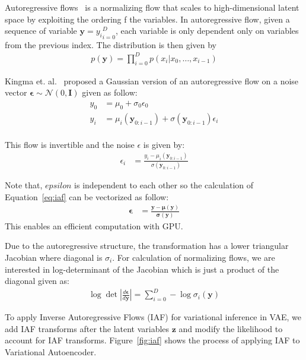\documentclass[runningheads]{llncs}
\begin{document}
Autoregressive flows~\cite{germain2015made} is a normalizing flow that scales to high-dimensional latent space by exploiting the ordering f the variables. In autoregressive flow, given a sequence of variable $\mathbf{y} = {y_i}_{i=0}^D$, each variable is only dependent only on variables from the previous index. The distribution is then given by
\begin{align}
p(\mathbf{y}) = \prod_{i=0}^{D} p(x_i | x_0,\dots,x_{i-1})
\end{align} 	 

Kingma et. al.~\cite{kingma2016improved} proposed a Gaussian version of an autoregressive flow on a noise vector $\mathbf{\epsilon} \sim \mathcal{N}(0,\mathbf{I})$ given as follow:
\begin{align}
y_0 &= \mu_0 + \sigma_0 \epsilon_0\\
y_i &= \mu_i(\mathbf{y}_{0:i-1}) + \sigma(\mathbf{y}_{0:i-1}) \epsilon_i\\
\end{align} 

This flow is invertible and the noise $\epsilon$ is given by:
\begin{align}
\epsilon_i &= \frac{y_i - \mu_i(\mathbf{y}_{0:i-1})}{\sigma(\mathbf{y}_{0:i-1})}
\label{eq:iaf}
\end{align} 

Note that, $epsilon$ is independent to each other so the calculation of Equation~\ref{eq:iaf} can be vectorized as follow:
\begin{align}
\bm{\epsilon} &= \frac{\mathbf{y} - \bm{\mu}(\mathbf{y})}{\bm{\sigma}(\mathbf{y})}
\end{align} 
This enables an efficient computation with GPU. 

Due to the autoregressive structure, the transformation has a lower triangular Jacobian where diagonal is $\sigma_i$. For calculation of normalizing flows, we are interested in log-determinant of the Jacobian which is just a product of the diagonal given as:
\begin{align}
\log \det \left| \frac{d\bm{\epsilon}}{d\mathbf{y}} \right| = \sum_{i=0}^{D} - \log \sigma_i(\mathbf{y})
\end{align}

To apply Inverse Autoregressive Flows (IAF) for variational inference in VAE, we add IAF transforms after the latent variables $\mathbf{z}$ and modify the likelihood to account for IAF transforms. Figure~\ref{fig:iaf} shows the process of applying IAF to Variational Autoencoder. 
\end{document}
